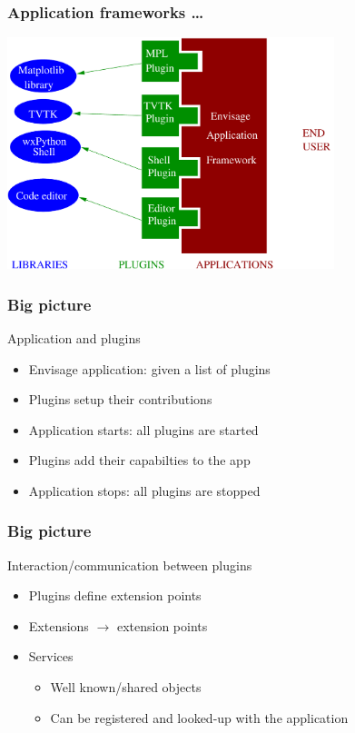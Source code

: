 \documentclass[14pt,compress]{beamer}
\begin{document}
\begin{frame}
  \frametitle{Application frameworks \ldots}
  \begin{center}
    \includegraphics[width=3.75in,interpolate=true]{images/framework}
  \end{center}
\end{frame}


\begin{frame}
  \frametitle{Big picture}
  \begin{block}{Application and plugins}
    \begin{itemize}
    \item Envisage application: given a list of plugins
    \item Plugins setup their contributions
    \item Application starts: all plugins are started
    \item Plugins add their capabilties to the app
    \item Application stops: all plugins are stopped
    \end{itemize}
  \end{block}
\end{frame}

\begin{frame}
  \frametitle{Big picture}
  \begin{block}{Interaction/communication between plugins}
    \begin{itemize}
    \item Plugins define extension points
    \item Extensions $\rightarrow$ extension points
    \item Services
      \begin{itemize}
      \item Well known/shared objects
      \item Can be registered and looked-up with the application
      \end{itemize}
    \end{itemize}
  \end{block}
\end{frame}
\end{document}
